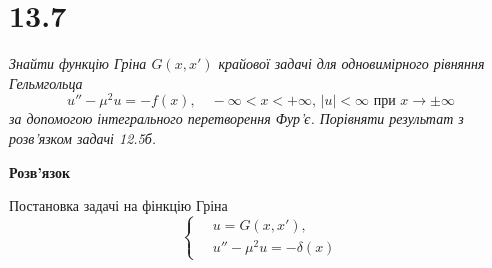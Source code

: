 %
%
%
%
%

\section[Задача №13.7]{13.7}

\textit{Знайти функцію Гріна $G(x,x')$ крайової задачі для одновимірного рівняння Гельмгольца \[u'' - \mu^2 u = - f(x), \quad -\infty < x < +\infty, \, |u| < \infty \text{ при } x \to \pm\infty \] за допомогою інтегрального перетворення Фур’є. Порівняти результат з розв’язком задачі 12.5б.}

\begin{center}
    \large{\textbf{Розв'язок}}
\end{center}

Постановка задачі на фінкцію Гріна 
\begin{equation}
    \left\{ \begin{aligned}
        \,& u = G(x, x'),\\
          & u'' - \mu^2 u = -\delta(x)
    \end{aligned} \right.
\end{equation}

